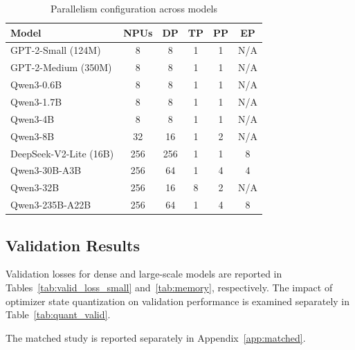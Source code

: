 \documentclass{article}
\begin{document}
\begin{table}[!htbp]
    \centering
    \small        
    
    \begin{tabular}{l c c c c c}
        \toprule
        {Model}  & NPUs & DP & TP & PP & EP \\
        \midrule
        GPT-2-Small (124M)   & 8   & 8  & 1 & 1 & N/A \\
        GPT-2-Medium (350M)  & 8   & 8  & 1 & 1 & N/A \\
        Qwen3-0.6B           & 8   & 8  & 1 & 1 & N/A \\
        Qwen3-1.7B           & 8   & 8  & 1 & 1 & N/A \\
        Qwen3-4B             & 8   & 8  & 1 & 1 & N/A \\
        Qwen3-8B             & 32  & 16 & 1 & 2 & N/A \\
        DeepSeek-V2-Lite (16B) & 256 & 256 & 1 & 1 & 8 \\
        Qwen3-30B-A3B        & 256  & 64 & 1 & 4 & 4 \\
        Qwen3-32B            & 256 & 16 & 8 & 2 & N/A \\
        Qwen3-235B-A22B      & 256 & 64  & 1 & 4 & 8 \\
        \bottomrule
    \end{tabular}
\caption{Parallelism configuration across models}
    \label{tab:para}
    
\end{table}

\FloatBarrier
\subsection{Validation Results}
\label{sec:val_loss}

Validation losses for dense and large-scale models are reported in Tables~\ref{tab:valid_loss_small} and~\ref{tab:memory}, respectively. The impact of optimizer state quantization on validation performance is examined separately in Table~\ref{tab:quant_valid}.

The matched study is reported separately in Appendix~\ref{app:matched}.
\end{document}
